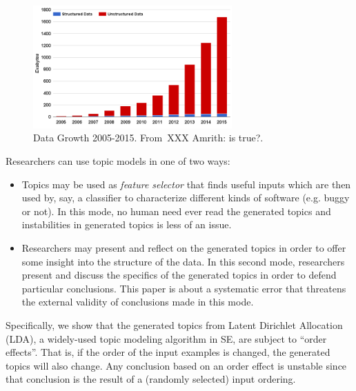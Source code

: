 \documentclass[10pt,conference]{IEEEtran}
\newcommand{\bi}{\begin{itemize}}
\newcommand{\ei}{\end{itemize}}
\theoremstyle{break}
\begin{document}
\begin{figure}[!b]
  \captionsetup{justification=centering}
  \includegraphics[width=3in]{./fig/data.png}
  \caption{Data Growth 2005-2015. From~\cite{nadkarni2014structured}XXX Amrith: is true?.}
  \label{fig: data}
\end{figure}


\noindent
Researchers can use topic models in one of two ways:
\bi
\item
Topics may be used as {\em feature selector} that finds useful inputs
which are then used by, say, a classifier to characterize different kinds of software (e.g. buggy or not).
In this mode, no human need ever read the generated topics and instabilities
in generated topics is less of an issue.
\item Researchers may present and reflect on the generated topics in order to offer some insight into the structure of the data.
  In this second mode, researchers present and discuss
  the specifics of the generated topics in order to defend particular conclusions. 
This paper is about a systematic error 
that threatens  the external validity of conclusions
made in this mode.
\ei
Specifically, we show that the generated topics from
Latent Dirichlet Allocation (LDA), a widely-used topic modeling algorithm in SE,  are subject to ``order effects''.
That is, if the order of the input examples is changed, the generated topics will also change.
Any conclusion based on an order effect is unstable since that conclusion is the result of a (randomly selected) input ordering.
\end{document}
